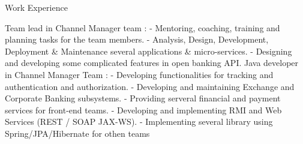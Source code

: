 \begin{jrsection}{Work Experience}
{\begin{jrdescription}
{        Team lead in Channel Manager team :\linebreak
            - Mentoring, coaching, training and planning tasks for the team members.\linebreak
            - Analysis, Design, Development, Deployment \& Maintenance several applications \& micro-services.\linebreak
            - Designing and developing some complicated features in open banking API.\linebreak
        Java developer in Channel Manager Team :\linebreak
            - Developing functionalities for tracking and authentication and authorization.\linebreak
            - Developing and maintaining Exchange and Corporate Banking subsystems.
            - Providing serveral financial and payment services for front-end teams.\linebreak
            - Developing and implementing RMI and Web Services (REST / SOAP JAX-WS).\linebreak
            - Implementing several library using Spring/JPA/Hibernate for othen teams\linebreak
        }
        \end{jrdescription}
    }
\end{jrsection}

